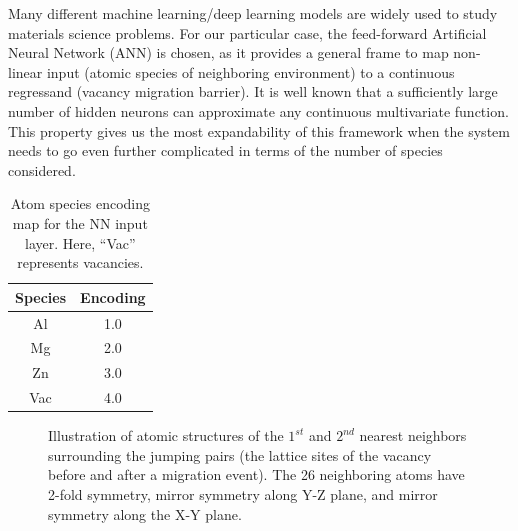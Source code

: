 Many different machine learning/deep learning models are widely used to study materials science problems\cite{bartok2010gaussian,behler2011atom,szlachta2014accuracy,artrith2016implementation,mehta2014exact,artrith2017efficient}. For our particular case, the feed-forward Artificial Neural Network (ANN) is chosen, as it provides a general frame to map non-linear input (atomic species of neighboring environment) to a continuous regressand (vacancy migration barrier). It is well known that a sufficiently large number of hidden neurons can approximate any continuous multivariate function\cite{hornik1989multilayer}. This property gives us the most expandability of this framework when the system needs to go even further complicated in terms of the number of species considered. 

\begin{table}[!htbp]
\centering
\caption[Atom species encoding map for the \acf{NN} input layer.]{Atom species encoding map for the \acf{NN} input layer. Here, ``Vac'' represents vacancies.}
\label{Chap:Al/Vac:tab:mapping}
\begin{tabular}{cc}
\\
\hline
\hline
Species & Encoding  \\ \hline
Al & 1.0 \\
Mg & 2.0 \\
Zn & 3.0 \\
Vac & 4.0 \\
\hline
\hline
\end{tabular}
\end{table}

\begingroup
\begin{figure}[!ht]
  \centering
\caption[Illustration of atomic structures of the $\text{1}^{st}$ and $\text{2}^{nd}$ nearest neighbors surrounding the jumping pairs.]{Illustration of atomic structures of the $\text{1}^{st}$ and $\text{2}^{nd}$ nearest neighbors surrounding the jumping pairs (the lattice sites of the vacancy before and after a migration event). The 26 neighboring atoms have 2-fold symmetry, mirror symmetry along Y-Z plane, and mirror symmetry along the X-Y plane.}
\label{Chap:Al/Vac:fig:2nn}
\end{figure}
\endgroup

